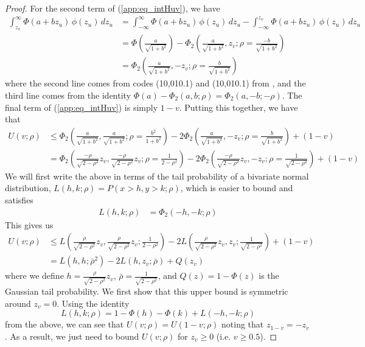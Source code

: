 \documentclass[11pt,a4paper]{article}
\begin{document}
\begin{appendices}
\begin{proof}
For the second term of  (\ref{app:eq_intHuv}), we have 
\begin{align*}
    \int_{z_v}^\infty \Phi(a + bz_u) \,\phi(z_u)\, dz_u &=   \int_{-\infty}^\infty \Phi(a + bz_u) \,\phi(z_u)\, dz_u -    \int_{-\infty}^{z_v} \Phi(a + bz_u) \,\phi(z_u)\, dz_u\\
    &=\Phi\left(\frac{a}{\sqrt{1+b^2}}\right) - \Phi_2\left(\frac{a}{\sqrt{1+b^2}}, z_v; \rho = \frac{-b}{\sqrt{1+b^2}}\right)\\
    &=\Phi_2\left(\frac{a}{\sqrt{1+b^2}}, -z_v; \rho = \frac{b}{\sqrt{1+b^2}}\right)
\end{align*}
where the second line comes from codes (10,010.1) and (10,010.1) from  \citet{Owen1980}, and the third line comes from the identity $\Phi(a) - \Phi_2(a,b; \rho) = \Phi_2(a,-b; -\rho)$.  The final term of  (\ref{app:eq_intHuv}) is simply $1-v$. Putting this together, we have that
\begin{align*}
  U(v; \rho) &\leq  \Phi_2\left(\frac{a}{\sqrt{1+b^2}},\frac{a}{\sqrt{1+b^2}}; \rho = \frac{b^2}{1+b^2}\right) -2\Phi_2\left(\frac{a}{\sqrt{1+b^2}}, -z_v; \rho = \frac{b}{\sqrt{1+b^2}}\right)+ (1-v)\\
  &= \Phi_2\left(\frac{-\rho}{\sqrt{2-\rho^2}}z_v,\frac{-\rho}{\sqrt{2-\rho^2}}z_v; \rho = \frac{1}{2-\rho^2}\right) -2\Phi_2\left(\frac{-\rho}{\sqrt{2-\rho^2}}z_v, -z_v; \rho = \frac{1}{\sqrt{2-\rho^2}}\right)+ (1-v)
\end{align*}
We will first write the above in terms of the tail probability of a bivariate normal distribution, $L(h,k;\rho) = P(x > h, y > k; \rho)$, which is easier to bound and satisfies
\begin{align*}
L(h,k; \rho) &= \Phi_2(-h,-k;\rho)
\end{align*}
This gives us 
\begin{align*}
 U(v; \rho) &\leq  L\left(\frac{\rho}{\sqrt{2-\rho^2}}z_v,\frac{\rho}{\sqrt{2-\rho^2}}z_v; \frac{1}{2-\rho^2}\right) - 2L\left(\frac{\rho}{\sqrt{2-\rho^2}}z_v, z_v; \frac{1}{\sqrt{2-\rho^2}}\right) + (1-v)\\
 &= L(h,h; \bar{\rho}^2) - 2L(h, z_v; \bar{\rho}) + Q(z_v)
\end{align*}
where we define $h = \frac{\rho}{\sqrt{2-\rho^2}}z_v$, $\bar{\rho} = \frac{1}{\sqrt{2-\rho^2}}$, and  $Q(z) = 1-\Phi(z)$ is the Gaussian tail probability.
 We first show that this upper bound is symmetric around $z_v = 0$. Using the identity 
 $$L(h,k;\rho) = 1-\Phi(h) - \Phi(k) + L(-h,-k;\rho)$$ 
 from the above, we can see that $U(v; \rho) = U(1-v; \rho)$ noting that $z_{1-v} = -z_v$.
As a result, we just need to bound  $U(v;\rho)$ for $z_v \geq 0$ (i.e. $v \geq 0.5$). 


\end{proof}
\end{appendices}
\end{document}
